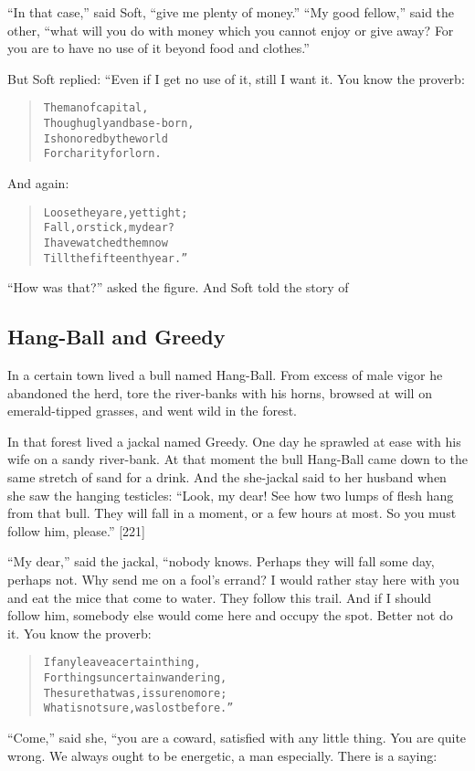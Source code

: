 \documentclass[article, twoside, 14pt]{memoir}
\renewenvironment{verbatim}{%
\begin{quote}%
\vskip -10pt%
\begin{alltt}\normalfont\large}{\end{alltt}%
\end{quote}%
\vskip -10pt
} %
\begin{document}
``In that case,'' said Soft, ``give me plenty of money.''
``My good fellow,'' said the other,
``what will you do with money which you cannot enjoy or give away? For you are to have no use of it beyond food and clothes.''

But Soft replied: “Even if I get no use of it, still I want it. You
know the proverb:

\begin{verbatim}
The man of capital,
    Though ugly and base-born,
Is honored by the world
    For charity forlorn.
\end{verbatim}
And again:

\begin{verbatim}
Loose they are, yet tight;
    Fall, or stick, my dear?
I have watched them now
    Till the fifteenth year.”
\end{verbatim}
``How was that?'' asked the figure. And Soft told the story of

\subsection{Hang-Ball and Greedy}

\label{s43}

In a certain town lived a bull named Hang-Ball. From excess of male
vigor he abandoned the herd, tore the river-banks with his horns,
browsed at will on emerald-tipped grasses, and went wild in the
forest.

In that forest lived a jackal named Greedy. One day he sprawled at
ease with his wife on a sandy river-bank. At that moment the bull
Hang-Ball came down to the same stretch of sand for a drink. And
the she-jackal said to her husband when she saw the hanging
testicles:
``Look, my dear! See how two lumps of flesh hang from that bull. They will fall in a moment, or a few hours at most. So you must follow him, please.''
[221]

``My dear,'' said the jackal, “nobody knows. Perhaps they will fall
some day, perhaps not. Why send me on a fool's errand? I would
rather stay here with you and eat the mice that come to water. They
follow this trail. And if I should follow him, somebody else would
come here and occupy the spot. Better not do it. You know the
proverb:

\begin{verbatim}
If any leave a certain thing,
For things uncertain wandering,
The sure that was, is sure no more;
What is not sure, was lost before.”
\end{verbatim}
``Come,'' said she, “you are a coward, satisfied with any little
thing. You are quite wrong. We always ought to be energetic, a man
especially. There is a saying:
\end{document}
